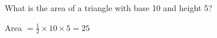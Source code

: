 \question What is the area of a triangle with base 10 and height 5?
\begin{solution}
Area $= \frac{1}{2} \times 10 \times 5 = 25$
\end{solution}
